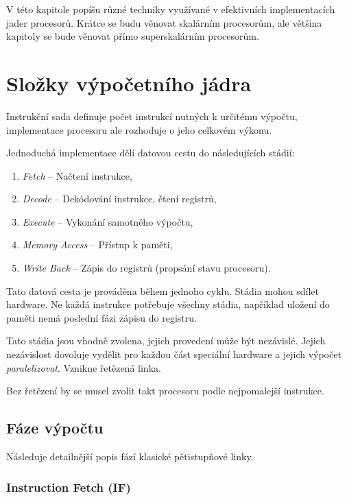 V této kapitole popíšu různé techniky využívané v efektivních implementacích jader procesorů.
Krátce se budu věnovat skalárním procesorům, ale většina kapitoly se bude věnovat přímo superskalárním procesorům.

\section{Složky výpočetního jádra}

Instrukční sada definuje počet instrukcí nutných k určitému výpočtu, implementace procesoru ale rozhoduje o jeho celkovém výkonu.

Jednoduchá implementace dělí datovou cestu do následujících stádií:
\begin{enumerate}
    \item \emph{Fetch} -- Načtení instrukce,
    \item \emph{Decode} -- Dekódování instrukce, čtení registrů,
    \item \emph{Execute} -- Vykonání samotného výpočtu,
    \item \emph{Memory Access} -- Přístup k paměti,
    \item \emph{Write Back} -- Zápis do registrů (propsání stavu procesoru).
\end{enumerate}
Tato datová cesta je prováděna během jednoho cyklu.
Stádia mohou sdílet hardware.
Ne každá instrukce potřebuje všechny stádia, například uložení do paměti nemá poslední fázi zápisu do registru.

Tato stádia jsou vhodně zvolena, jejich provedení může být nezávislé.
Jejich nezávislost dovoluje vydělit pro každou část speciální hardware a jejich výpočet \emph{paralelizovat}.
Vznikne řetězená linka.
\cite{OrganizationAndDesign}

Bez řetězení by se musel zvolit takt procesoru podle nejpomalejší instrukce. 

\subsection{Fáze výpočtu}

Následuje detailnější popis fází klasické pětistupňové linky.

\subsubsection{Instruction Fetch (IF)}


